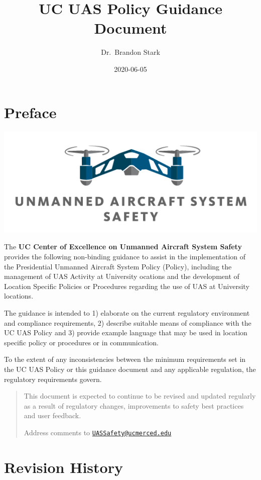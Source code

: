 \documentclass[
]{book}
\title{UC UAS Policy Guidance Document}
\author{Dr.~Brandon Stark}
\date{2020-06-05}
\begin{document}
\maketitle

{
\setcounter{tocdepth}{1}
\tableofcontents
}
\hypertarget{preface}{%
\chapter*{Preface}\label{preface}}

\begin{center}\includegraphics[width=0.5\linewidth]{images/COE_logo} \end{center}

The \textbf{UC Center of Excellence on Unmanned Aircraft System Safety} provides the following non-binding guidance to assist in the implementation of the Presidential Unmanned Aircraft System Policy (Policy), including the management of UAS Activity at University ocations and the development of Location Specific Policies or Procedures regarding the use of UAS at University locations.

The guidance is intended to 1) elaborate on the current regulatory environment and compliance requirements, 2) describe suitable means of compliance with the UC UAS Policy and 3) provide example language that may be used in location specific policy or procedures or in communication.

To the extent of any inconsistencies between the minimum requirements set in the UC UAS Policy or this guidance document and any applicable regulation, the regulatory requirements govern.

\begin{quote}
This document is expected to continue to be revised and updated regularly as a result of regulatory changes, improvements to safety best practices and user feedback.

Address comments to \href{mailto:UASSafety@ucmerced.edu}{\nolinkurl{UASSafety@ucmerced.edu}}
\end{quote}

\hypertarget{revision-history}{%
\chapter*{Revision History}\label{revision-history}}
\end{document}
